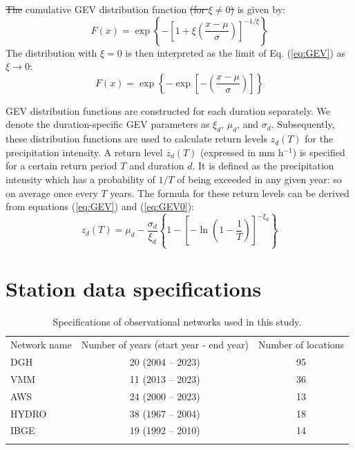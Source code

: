 \documentclass[journal abbreviation, manuscript]{copernicus}
\providecommand{\DIFadd}[1]{{\protect\color{blue}\uwave{#1}}} %
\providecommand{\DIFdel}[1]{{\protect\color{red}\sout{#1}}} %
\providecommand{\DIFaddbegin}{} %
\providecommand{\DIFaddend}{} %
\providecommand{\DIFdelbegin}{} %
\providecommand{\DIFdelend}{} %
\begin{document}
\DIFdelbegin \DIFdel{The }\DIFdelend \DIFaddbegin \DIFadd{For $\xi \neq 0$, the }\DIFaddend cumulative GEV distribution function \DIFdelbegin \DIFdel{(for $\xi \neq 0$) }\DIFdelend \DIFaddbegin \DIFadd{$F(x)$ }\DIFaddend is given by: 
\begin{equation}
    F(x) = \exp \left\{- \left[1 + \xi \left(\frac{x - \mu}{\sigma} \right) \right]^{-1/\xi} \right\}
\label{eq:GEV}
\end{equation}
The distribution with $\xi = 0$ is then interpreted as the limit of Eq. (\ref{eq:GEV}) as $\xi \to 0$:
\begin{equation}
    F(x) = \exp \left\{- \exp \left[- \left(\frac{x - \mu}{\sigma} \right) \right] \right\}
\label{eq:GEV0}
\end{equation}

GEV distribution functions are constructed for each duration separately. We denote the duration-specific GEV parameters as $\xi_d$, $\mu_d$, and $\sigma_d$. Subsequently, these distribution functions are used to calculate return levels $z_d(T)$ for the precipitation intensity. A return level $z_d(T)$ (expressed in mm h$^{-1}$) is specified for a certain return period $T$ and duration $d$. It is defined as the precipitation intensity which has a probability of $1/T$ of being exceeded in any given year: so on average once every $T$ years. The formula for these return levels can be derived from equations (\ref{eq:GEV}) and (\ref{eq:GEV0}):
\begin{equation}
    z_d(T) = \mu_d - \frac{\sigma_d}{\xi_d} \left\{1 - \left[- \ln{\left(1 - \frac{1}{T} \right)} \right]^{-\xi_d} \right\}
\end{equation}

\newpage

\section{Station data specifications}

\begin{table}[h!]
\caption{Specifications of observational networks used in this study.}
\begin{tabular}{lcc}
\tophline
Network name & Number of years (start year - end year) & Number of locations \\
\middlehline
DGH & 20 (2004 -- 2023) & 95 \\
VMM & 11 (2013 -- 2023) & 36 \\
AWS & 24 (2000 -- 2023) & 13 \\
HYDRO & 38 (1967 -- 2004) & 18 \\
IBGE & 19 (1992 -- 2010) & 14 \\
\bottomhline
\end{tabular}
\belowtable{} \label{tab:stations}
\end{table}
\end{document}
